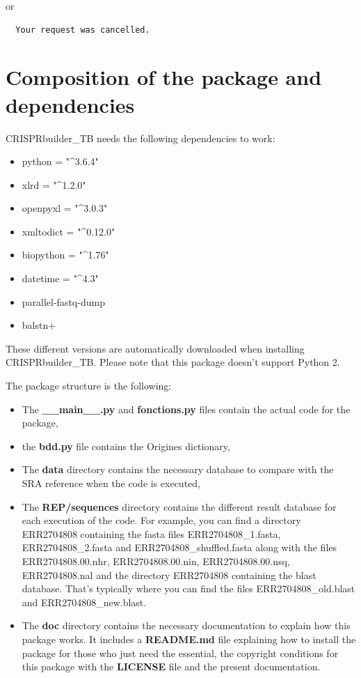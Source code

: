 \documentclass[twoside,a4paper,11pt,frenchb,openany]{report}
\begin{document}
    or

    \begin{verbatim}
  Your request was cancelled.
\end{verbatim}


    \section{Composition of the package and
dependencies}\label{composition-of-the-package-and-dependencies}

    CRISPRbuilder\_TB needs the following dependencies to work:

\begin{itemize}
\item
  python = "\^{}3.6.4"
\item
  xlrd = "\^{}1.2.0"
\item
  openpyxl = "\^{}3.0.3"
\item
  xmltodict = "\^{}0.12.0"
\item
  biopython = "\^{}1.76"
\item
  datetime = "\^{}4.3"
\item
  parallel-fastq-dump
\item
  balstn+
\end{itemize}

These different versions are automatically downloaded when installing
CRISPRbuilder\_TB. Please note that this package doesn't support Python
2.

    The package structure is the following:

    \begin{itemize}
\item
  The \textbf{\_\_main\_\_.py} and \textbf{fonctions.py} files contain
  the actual code for the package,
\item
  the \textbf{bdd.py} file contains the Origines dictionary,
\item
  The \textbf{data} directory contains the necessary database to compare
  with the SRA reference when the code is executed,
\item
  The \textbf{REP/sequences} directory contains the different result
  database for each execution of the code. For example, you can find a
  directory ERR2704808 containing the fasta files ERR2704808\_1.fasta,
  ERR2704808\_2.fasta and ERR2704808\_shuffled.fasta along with the
  files ERR2704808.00.nhr, ERR2704808.00.nin, ERR2704808.00.nsq,
  ERR2704808.nal and the directory ERR2704808 containing the blast
  database. That's typically where you can find the files
  ERR2704808\_old.blast and ERR2704808\_new.blast.
\item
  The \textbf{doc} directory contains the necessary documentation to
  explain how this package works. It includes a \textbf{README.md} file
  explaining how to install the package for those who just need the
  essential, the copyright conditions for this package with the
  \textbf{LICENSE} file and the present documentation.
\end{itemize}
\end{document}
